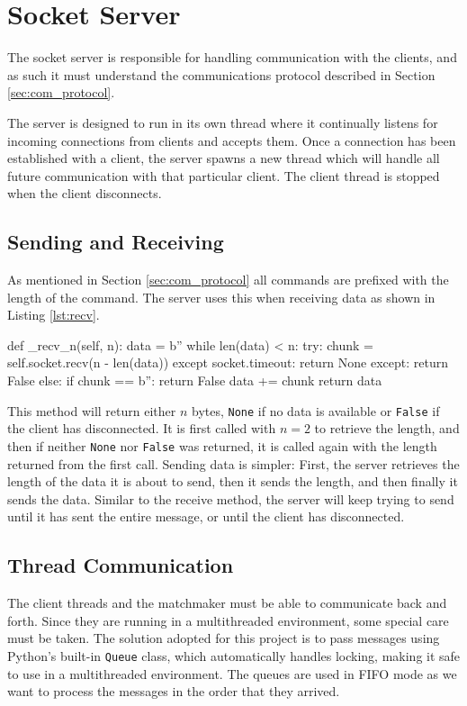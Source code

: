 \section{Socket Server}
The socket server is responsible for handling communication with the clients, and as such it must understand the communications protocol described in Section \ref{sec:com_protocol}.

The server is designed to run in its own thread where it continually listens for incoming connections from clients and accepts them.
Once a connection has been established with a client, the server spawns a new thread which will handle all future communication with that particular client.
The client thread is stopped when the client disconnects.

\subsection{Sending and Receiving}
As mentioned in Section \ref{sec:com_protocol} all commands are prefixed with the length of the command.
The server uses this when receiving data as shown in Listing \ref{lst:recv}.

\begin{code}[language={Python}, caption={Method for Receiving $n$ Bytes}, label={lst:recv}]
def _recv_n(self, n):
	data = b''
	while len(data) < n:
		try:
			chunk = self.socket.recv(n - len(data))
		except socket.timeout:
			return None
		except:
			return False
		else:
			if chunk == b'':
				return False
			data += chunk
	return data
\end{code}

This method will return either $n$ bytes, \texttt{None} if no data is available or \texttt{False} if the client has disconnected.
It is first called with $n=2$ to retrieve the length, and then if neither \texttt{None} nor \texttt{False} was returned, it is called again with the length returned from the first call.
Sending data is simpler: First, the server retrieves the length of the data it is about to send, then it sends the length, and then finally it sends the data.
Similar to the receive method, the server will keep trying to send until it has sent the entire message, or until the client has disconnected.

\subsection{Thread Communication}
The client threads and the matchmaker must be able to communicate back and forth.
Since they are running in a multithreaded environment, some special care must be taken.
The solution adopted for this project is to pass messages using Python's built-in \texttt{Queue} class, which automatically handles locking, making it safe to use in a multithreaded environment.
The queues are used in FIFO mode as we want to process the messages in the order that they arrived.

